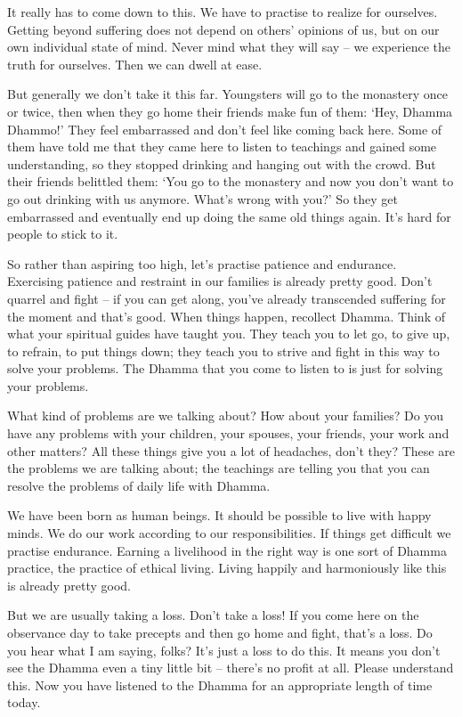 It really has to come down to this. We have to practise to realize for ourselves. Getting beyond suffering does not depend on others' opinions of us, but on our own individual state of mind. Never mind what they will say -- we experience the truth for ourselves. Then we can dwell at ease. 

But generally we don't take it this far. Youngsters will go to the monastery once or twice, then when they go home their friends make fun of them: `Hey, Dhamma Dhammo!' They feel embarrassed and don't feel like coming back here. Some of them have told me that they came here to listen to teachings and gained some understanding, so they stopped drinking and hanging out with the crowd. But their friends belittled them: `You go to the monastery and now you don't want to go out drinking with us anymore. What's wrong with you?' So they get embarrassed and eventually end up doing the same old things again. It's hard for people to stick to it. 

So rather than aspiring too high, let's practise patience and endurance. Exercising patience and restraint in our families is already pretty good. Don't quarrel and fight -- if you can get along, you've already transcended suffering for the moment and that's good. When things happen, recollect Dhamma. Think of what your spiritual guides have taught you. They teach you to let go, to give up, to refrain, to put things down; they teach you to strive and fight in this way to solve your problems. The Dhamma that you come to listen to is just for solving your problems. 

What kind of problems are we talking about? How about your families? Do you have any problems with your children, your spouses, your friends, your work and other matters? All these things give you a lot of headaches, don't they? These are the problems we are talking about; the teachings are telling you that you can resolve the problems of daily life with Dhamma. 

We have been born as human beings. It should be possible to live with happy minds. We do our work according to our responsibilities. If things get difficult we practise endurance. Earning a livelihood in the right way is one sort of Dhamma practice, the practice of ethical living. Living happily and harmoniously like this is already pretty good. 

But we are usually taking a loss. Don't take a loss! If you come here on the observance day to take precepts and then go home and fight, that's a loss. Do you hear what I am saying, folks? It's just a loss to do this. It means you don't see the Dhamma even a tiny little bit -- there's no profit at all. Please understand this. Now you have listened to the Dhamma for an appropriate length of time today.

